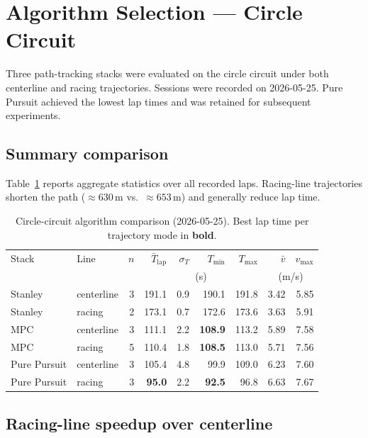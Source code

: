 \documentclass[11pt,a4paper]{article}
\newcommand{\best}[1]{\textbf{#1}}
\begin{document}
\section{Algorithm Selection --- Circle Circuit}
\label{sec:circle}

Three path-tracking stacks were evaluated on the circle circuit under both
centerline and racing trajectories.
Sessions were recorded on 2026-05-25.
Pure Pursuit achieved the lowest lap times and was retained for subsequent experiments.

\subsection{Summary comparison}

Table~\ref{tab:circle-summary} reports aggregate statistics over all recorded laps.
Racing-line trajectories shorten the path ($\approx\!630$\,m vs.\ $\approx\!653$\,m)
and generally reduce lap time.

\begin{table}[H]
  \centering
  \caption{Circle-circuit algorithm comparison (2026-05-25).
           Best lap time per trajectory mode in \best{bold}.}
  \label{tab:circle-summary}
  \small
  \begin{tabular}{@{}llrrrrrrr@{}}
    \toprule
    Stack & Line & $n$ &
    $\bar{T}_{\mathrm{lap}}$ & $\sigma_{T}$ &
    $T_{\min}$ & $T_{\max}$ &
    $\bar{v}$ & $v_{\max}$ \\
    & & & \multicolumn{4}{c}{(s)} & \multicolumn{2}{c}{(m/s)} \\
    \midrule
    Stanley   & centerline & 3 & 191.1 & 0.9 & 190.1 & 191.8 & 3.42 & 5.85 \\
    Stanley   & racing     & 2 & 173.1 & 0.7 & 172.6 & 173.6 & 3.63 & 5.91 \\
    \addlinespace
    MPC       & centerline & 3 & 111.1 & 2.2 & \best{108.9} & 113.2 & 5.89 & 7.58 \\
    MPC       & racing     & 5 & 110.4 & 1.8 & \best{108.5} & 113.0 & 5.71 & 7.56 \\
    \addlinespace
    Pure Pursuit & centerline & 3 & 105.4 & 4.8 & 99.9  & 109.0 & 6.23 & 7.60 \\
    Pure Pursuit & racing     & 3 & \best{95.0}  & 2.2 & \best{92.5}  & 96.8  & 6.63 & 7.67 \\
    \bottomrule
  \end{tabular}
\end{table}

\subsection{Racing-line speedup over centerline}
\end{document}
